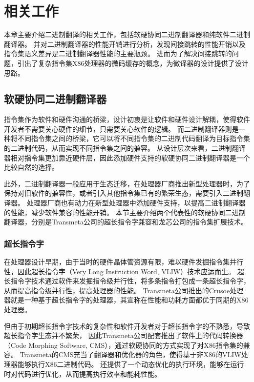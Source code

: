\chapter{相关工作}\label{chap:related_work}

本章主要介绍二进制翻译的相关工作，包括软硬协同二进制翻译器和纯软件二进制翻译器。
并对二进制翻译器的性能开销进行分析，发现间接跳转的性能开销以及指令集语义差异是二进制翻译器性能的主要瓶颈。
进而为了解决间接跳转的问题，引出了复杂指令集X86处理器的微码缓存的概念，为微译器的设计提供了设计思路。

\section{软硬协同二进制翻译器}

指令集作为软件和硬件沟通的桥梁，设计初衷是让软件和硬件设计解耦，使得软件开发者不需要关心硬件的细节，只需要关心软件的逻辑。
而二进制翻译器则是一种将不同指令集之间的桥梁，它可以将不同指令集的二进制代码翻译为目标指令集的二进制代码，从而实现不同指令集之间的兼容。
从设计层次来看，二进制翻译器相对指令集更加靠近硬件层，因此添加硬件支持的软硬协同二进制翻译器是一个比较自然的选择。

此外，二进制翻译器一般应用于生态迁移，在处理器厂商推出新型处理器时，为了保持对旧软件的兼容性，或者引入其他指令集已有的繁荣生态，需要引入二进制翻译器。
处理器厂商也有动力在新型处理器中添加硬件支持，以提高二进制翻译器的性能，减少软件兼容的性能开销。
本节主要介绍两个代表性的软硬协同二进制翻译器，分别是Transmeta公司的超长指令字兼容和龙芯公司的指令集扩展技术。

\subsection{超长指令字}

在处理器设计早期，由于当时的硬件晶体管资源有限，难以硬件发掘指令集并行性，因此超长指令字（Very Long Instruction Word, VLIW）技术应运而生。
超长指令字技术通过软件来发掘指令级并行性，将多条指令打包成一条超长指令字，从而提高指令级并行性，提高处理器的性能。
Transmeta公司推出的Crusoe处理器就是一种基于超长指令字的处理器，其宣称在性能和功耗方面都优于同期的X86处理器\cite{dehnertTransmetaCodeMorphing2003}。

但由于初期超长指令字技术的复杂性和软件开发者对于超长指令字的不熟悉，导致超长指令字生态并不繁荣，
因此Transmeta公司配套推出了软件上的代码转换器（Code Morphing Software, CMS），通过软硬协同的方式实现了对X86指令集的兼容。
Transmeta的CMS充当了翻译器和优化器的角色，使得基于非X86的VLIW处理器能够执行X86二进制代码。
还提供了一个动态优化的执行环境，能够在运行时对代码进行优化，从而提高执行效率和能耗性能\cite{dehnertTransmetaCodeMorphing2003}。

